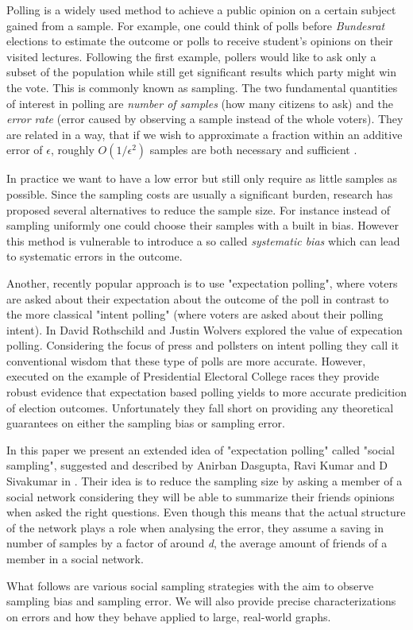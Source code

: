 Polling is a widely used method to achieve a public opinion on a certain subject gained from a sample. For example, one could think of polls before \textit{Bundesrat} elections to estimate the outcome or polls to receive student's opinions on their visited lectures.
Following the first example, pollers would like to ask only a subset of the population while still get significant results which party might win the vote. This is commonly known as sampling.
The two fundamental quantities of interest in polling are \textit{number of samples} (how many citizens to ask) and the \textit{error rate} (error caused by observing a sample instead of the whole voters). They are related in a way, that if we wish to approximate a fraction within an additive error of $\epsilon$, roughly $O(1/\epsilon^{2})$ samples are both necessary and sufficient .

In practice we want to have a low error but still only require as little samples as possible.
Since the sampling costs are usually a significant burden, research has proposed several alternatives to reduce the sample size.
For instance instead of sampling uniformly one could choose their samples with a built in bias.
However this method is vulnerable to introduce a so called \textit{systematic bias} which can lead to systematic errors in the outcome.

Another, recently popular approach is to use "expectation polling", where voters are asked about their expectation about the outcome of the poll in contrast to the more classical "intent polling" (where voters are asked about their polling intent). In \cite{rothschild2009forecasting} David Rothschild and Justin Wolvers explored the value of expecation polling. Considering the focus of press and pollsters on intent polling they call it conventional wisdom that these type of polls are more accurate. However, executed on the example of Presidential Electoral College races they provide robust evidence that expectation based polling yields to more accurate predicition of election outcomes.
Unfortunately they fall short on providing any theoretical guarantees on either the sampling bias or sampling error.

In this paper we present an extended idea of "expectation polling" called "social sampling", suggested and described by Anirban Dasgupta, Ravi Kumar and D Sivakumar in \cite{dasgupta2012social}.
Their idea is to reduce the sampling size by asking a member of a social network considering they will be able to summarize their friends opinions when asked the right questions.
Even though this means that the actual structure of the network plays a role when analysing the error, they assume a saving in number of samples by a factor of around \textit{d}, the average amount of friends of a member in a social network.

What follows are various social sampling strategies with the aim to observe sampling bias and sampling error.
We will also provide precise characterizations on errors and how they behave applied to large, real-world graphs.
